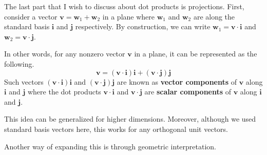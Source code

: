\documentclass[../../../main.tex]{subfiles}
\begin{document}
The last part that I wish to discuss about dot products is
projections. First, consider a vector $\mathbf{v} = \mathbf{w}_1
+ \mathbf{w}_2$ in a plane where $\mathbf{w}_1$ and $\mathbf{w}_2$ are
along the standard basis $\mathbf{i}$ and $\mathbf{j}$ respectively.
By construction, we can write $\mathbf{w}_1 = \mathbf{v} \cdot
\mathbf{i}$ and $\mathbf{w}_2 = \mathbf{v} \cdot \mathbf{j}$.

\begin{important}
In other words, for any nonzero vector $\mathbf{v}$ in a plane,
it can be represented as the following.
\[
\mathbf{v}
= (\mathbf{v} \cdot \mathbf{i}) \mathbf{i} +
    (\mathbf{v} \cdot \mathbf{j}) \mathbf{j}
\]
Such vectors $(\mathbf{v} \cdot \mathbf{i}) \mathbf{i}$ and
$(\mathbf{v} \cdot \mathbf{j}) \mathbf{j}$ are known as
\textbf{vector components} of $\mathbf{v}$ along $\mathbf{i}$ and
$\mathbf{j}$ where the dot products $\mathbf{v} \cdot \mathbf{i}$ and
$\mathbf{v} \cdot \mathbf{j}$ are \textbf{scalar components} of
$\mathbf{v}$ along $\mathbf{i}$ and $\mathbf{j}$.
\end{important}

This idea can be generalized for higher dimensions. Moreover,
although we used standard basis vectors here, this works for any
orthogonal unit vectors.

Another way of expanding this is through geometric interpretation.
\end{document}
